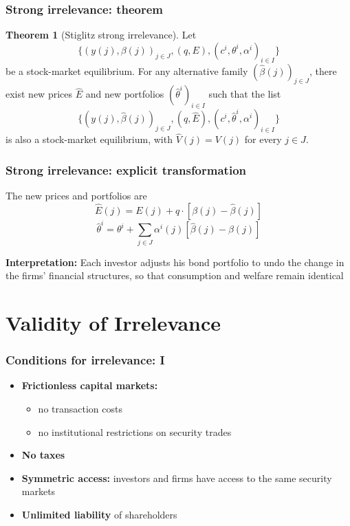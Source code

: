 \documentclass[blue]{beamer}
\theoremstyle{definition}
\theoremstyle{example}
\newtheorem*{theoremns}{Theorem}
\begin{document}
\begin{frame}\frametitle{Strong irrelevance: theorem}
\begin{theoremns}[Stiglitz strong irrelevance]
Let
\begin{equation*}
\bigl\{ (y(j), \beta(j))_{j \in J}, (q, E), (c^i, \theta^i, \alpha^i)_{i \in I} \bigr\}
\end{equation*}
be a stock-market equilibrium.
For any alternative family $(\widehat{\beta}(j))_{j \in J}$, there exist new prices $\widehat{E}$ and new portfolios $(\widehat{\theta}^i)_{i\in I}$ such that the list
\begin{equation*}
\bigl\{ (y(j), \widehat{\beta}(j))_{j \in J}, (q, \widehat{E}), (c^i, \widehat{\theta}^i, \alpha^i)_{i \in I} \bigr\}
\end{equation*}
is also a stock-market equilibrium, with $\widehat{V}(j) = V(j)$ for every $j \in J$.
\end{theoremns}
\end{frame}

\begin{frame}\frametitle{Strong irrelevance: explicit transformation}
The new prices and portfolios are
\begin{equation*}
\widehat{E}(j) = E(j) + q \cdot [\beta(j) - \widehat{\beta}(j)]
\end{equation*}
\begin{equation*}
\widehat{\theta}^i = \theta^i + \sum_{j \in J} \alpha^i(j) [\widehat{\beta}(j) - \beta(j)]
\end{equation*}
\bigskip

\textbf{Interpretation:} Each investor adjusts his bond portfolio to undo the change in the firms' financial structures, so that consumption and welfare remain identical
\end{frame}

\section{Validity of Irrelevance}

\begin{frame}\frametitle{Conditions for irrelevance: I}
\begin{itemize}
\item \textbf{Frictionless capital markets:}
    \begin{itemize}
    \item no transaction costs
    \item no institutional restrictions on security trades
    \end{itemize}
\item \textbf{No taxes}
\item \textbf{Symmetric access:} investors and firms have access to the same security markets
\item \textbf{Unlimited liability} of shareholders
\end{itemize}
\end{frame}
\end{document}
